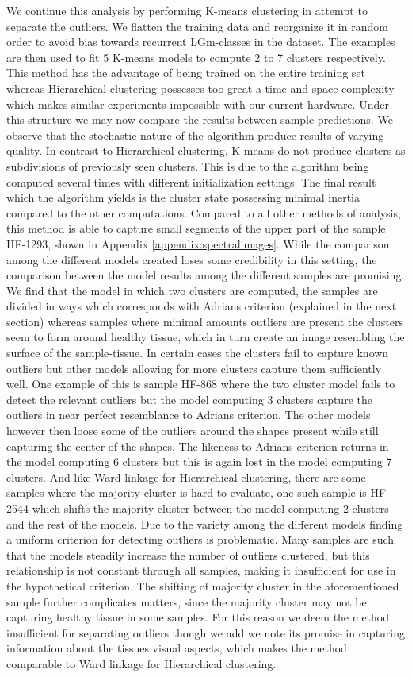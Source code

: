 We continue this analysis by performing K-means clustering in attempt to separate the outliers. We flatten the training data and reorganize it in random order to avoid bias towards recurrent LGm-classes in the dataset. The examples are then used to fit 5 K-means models to compute 2 to 7 clusters respectively. This method has the advantage of being trained on the entire training set whereas Hierarchical clustering possesses too great a time and space complexity which makes similar experiments impossible with our current hardware. Under this structure we may now compare the results between sample predictions. We observe that the stochastic nature of the algorithm produce results of varying quality. In contrast to Hierarchical clustering, K-means do not produce clusters as subdivisions of previously seen clusters. This is due to the algorithm being computed several times with different initialization settings. The final result which the algorithm yields is the cluster state possessing minimal inertia compared to the other computations. Compared to all other methods of analysis, this method is able to capture small segments of the upper part of the sample HF-1293, shown in Appendix \ref{appendix:spectralimages}. While the comparison among the different models created loses some credibility in this setting, the comparison between the model results among the different samples are promising. We find that the model in which two clusters are computed, the samples are divided in ways which corresponds with Adrians criterion (explained in the next section) whereas samples where minimal amounts outliers are present the clusters seem to form around healthy tissue, which in turn create an image resembling the surface of the sample-tissue. In certain cases the clusters fail to capture known outliers but other models allowing for more clusters capture them sufficiently well. One example of this is sample HF-868 where the two cluster model fails to detect the relevant outliers but the model computing 3 clusters capture the outliers in near perfect resemblance to Adrians criterion. The other models however then loose some of the outliers around the shapes present while still capturing the center of the shapes. The likeness to Adrians criterion returns in the model computing 6 clusters but this is again lost in the model computing 7 clusters. And like Ward linkage for Hierarchical clustering, there are some samples where the majority cluster is hard to evaluate, one such sample is HF-2544 which shifts the majority cluster between the model computing 2 clusters and the rest of the models. Due to the variety among the different models finding a uniform criterion for detecting outliers is problematic. Many samples are such that the models steadily increase the number of outliers clustered, but this relationship is not constant through all samples, making it insufficient for use in the hypothetical criterion. The shifting of majority cluster in the aforementioned sample further complicates matters, since the majority cluster may not be capturing healthy tissue in some samples. For this reason we deem the method insufficient for separating outliers though we add we note its promise in capturing information about the tissues visual aspects, which makes the method comparable to Ward linkage for Hierarchical clustering.

